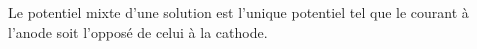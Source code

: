 ﻿\documentclass[a4paper]{article}
\begin{document}
\pagestyle{fancy}
\fancyhf{}
\setlength{\headheight}{15pt}

\begin{center}
	\large{}
\end{center}


Le potentiel mixte d'une solution est l'unique potentiel tel que le courant à l'anode soit l'opposé de celui à la cathode.
\end{document}
